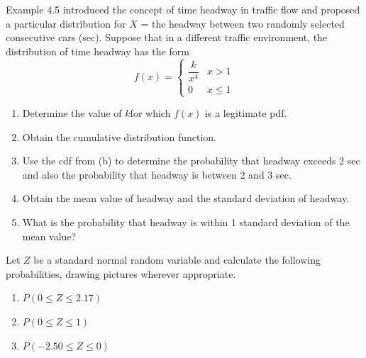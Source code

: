 \documentclass[11pt,letterpaper,boxed]{hmcpset}
\begin{document}
{%

\begin{problem}[4.2.13]
	Example 4.5 introduced the concept of time headway in traffic flow and proposed a particular distribution for $X$ = the headway between two randomly selected consecutive cars (sec). Suppose that in a different traffic environment, the distribution of time headway has the form
		$$f(x) = \begin{cases}
			\dfrac{k}{x^4} & x > 1 \\
			0 & x \leq 1
		\end{cases}$$
	\begin{enumerate}
		\item
			Determine the value of $k $for which $f(x)$ is a legitimate pdf.
		\item
			Obtain the cumulative distribution function.
		\item
			Use the cdf from (b) to determine the probability that headway exceeds 2 sec and also the probability that headway is between 2 and 3 sec.
		\item
			Obtain the mean value of headway and the standard deviation of headway.
		\item
			What is the probability that headway is within 1 standard deviation of the mean value?
	\end{enumerate}
\end{problem}

\begin{solution}
	\vfill
\end{solution}
\newpage


\begin{problem}[4.3.28]
	Let $Z$ be a standard normal random variable and calculate the following probabilities, drawing pictures wherever appropriate.
	\begin{enumerate}
		\item
			$P(0 \leq Z \leq 2.17)$
		\item
			$P(0 \leq Z \leq 1)$
		\item
			$P(-2.50 \leq Z \leq 0)$
	\end{enumerate}
\end{problem}

\begin{solution}
	\vfill
\end{solution}
\newpage

}
\end{document}
